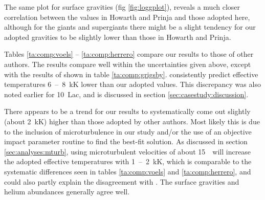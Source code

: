 The same plot for surface gravities (fig \ref{fig:loggplot}), reveals
a much closer correlation between the values in Howarth and Prinja and
those adopted here, although for the giants and supergiants there
might be a slight tendency for our adopted gravities to be slightly
lower than those in Howarth and Prinja.

Tables \ref{ta:comp:voels} -- \ref{ta:comp:herrero} compare our
results to those of other authors. The results compare well within the
uncertainties given above, except with the results of 
shown in table \ref{ta:comp:grigsby}.  consistently
predict effective temperatures 6~--~8~kK lower than our adopted
values. This discrepancy was also noted earlier for 10~Lac, and is
discussed in section \ref{sec:casestudy:discussion}.

There appears to be a trend for our results to systematically come out
slightly (about 2~kK) higher than those adopted by other authors. Most
likely this is due to the inclusion of microturbulence in our study
and/or the use of an objective impact parameter routine to find the
best-fit solution. As discussed in section \ref{sec:analyses:mturb},
using microturbulent velocities of about 15~\kms\ will increase the
adopted effective temperatures with 1~--~2~kK, which is comparable to
the systematic differences seen in tables \ref{ta:comp:voels} and
\ref{ta:comp:herrero}, and could also partly explain the disagreement
with . The surface gravities and helium abundances
generally agree well.

